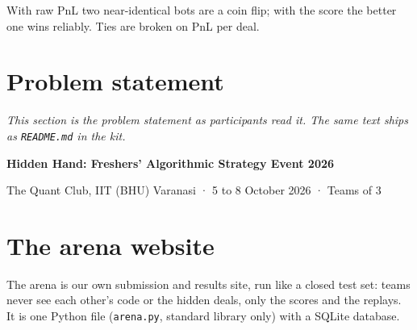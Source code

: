 \documentclass[11pt,a4paper]{article}
\newcommand{\code}[1]{\texttt{#1}}
\begin{document}
With raw PnL two near-identical bots are a coin flip; with the score the better one wins
reliably. Ties are broken on PnL per deal.

\newpage
\section{Problem statement}\label{sec:ps}

{\color{quiet}\itshape This section is the problem statement as participants read it. The same
text ships as \code{README.md} in the kit.}

\vspace{0.6em}
{\sffamily\Large\bfseries Hidden Hand: Freshers' Algorithmic Strategy Event 2026}\par
{\color{quiet}The Quant Club, IIT (BHU) Varanasi · 5 to 8 October 2026 · Teams of 3}



\newpage
\section{The arena website}

The arena is our own submission and results site, run like a closed test set: teams never see
each other's code or the hidden deals, only the scores and the replays. It is one Python file
(\code{arena.py}, standard library only) with a SQLite database.
\end{document}

